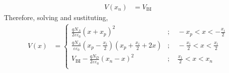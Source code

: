 \documentclass[titlepage, fleqn, a4paper, 12pt, twoside]{article}
\theoremstyle{definition}
\theoremstyle{theorem}
\begin{document}
\begin{solution}
\begin{enumerate}[leftmargin=*]
\begin{align*}
				V(x_n) & = V_{\text{BI}}
			\end{align*}
			Therefore, solving and sustituting,
			\begin{align*}
				V(x) &=
					\begin{cases}
						\frac{q N_A}{2 \varepsilon \varepsilon_0} (x + x_p)^2                                                               & ;\quad -x_p < x < -\frac{x_i}{2}          \\
						\frac{q N_A}{\varepsilon \varepsilon_0} \left( x_p - \frac{x_i}{2} \right) \left( x_p + \frac{x_i}{2} + 2 x \right) & ;\quad -\frac{x_i}{2} < x < \frac{x_i}{2} \\
						V_{\text{BI}} - \frac{q N_D}{2 \varepsilon \varepsilon_0} (x_n - x)^2                                               & ;\quad \frac{x_1}{2} < x < x_n            \\
					\end{cases}
			\end{align*}
	\end{enumerate}
\end{solution}
\end{document}
